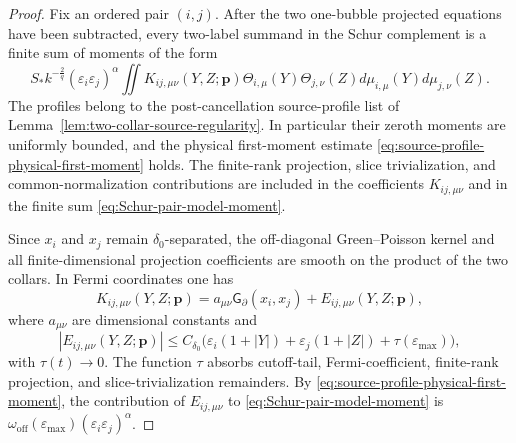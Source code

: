 \documentclass[11pt,reqno,a4paper]{amsart}
\numberwithin{equation}{section}
\theoremstyle{plain}
\theoremstyle{remark}
\theoremstyle{plain}
\begin{document}
\begin{proof}
Fix an ordered pair $(i,j)$.  After the two one-bubble projected equations have
been subtracted, every two-label summand in the Schur complement is a finite sum
of moments of the form
\begin{equation}\label{eq:Schur-pair-model-moment}
S_\ast k^{-\frac2q}
(\varepsilon_i\varepsilon_j)^\alpha
\iint
K_{ij,\mu\nu}(Y,Z;\mathbf p)
\Theta_{i,\mu}(Y)\Theta_{j,\nu}(Z)
d\mu_{i,\mu}(Y)d\mu_{j,\nu}(Z).
\end{equation}
The profiles belong to the post-cancellation source-profile list of
Lemma~\ref{lem:two-collar-source-regularity}.  In particular their zeroth moments
are uniformly bounded, and the physical first-moment estimate
\eqref{eq:source-profile-physical-first-moment} holds.
The finite-rank projection, slice
trivialization, and common-normalization contributions are included in the
coefficients $K_{ij,\mu\nu}$ and in the finite sum \eqref{eq:Schur-pair-model-moment}.

Since $x_i$ and $x_j$ remain $\delta_0$-separated, the off-diagonal Green--Poisson
kernel and all finite-dimensional projection coefficients are smooth on the
product of the two collars.  In Fermi coordinates one has
\begin{equation}\label{eq:Schur-kernel-freeze}
K_{ij,\mu\nu}(Y,Z;\mathbf p)
=
a_{\mu\nu}\mathsf G_\partial(x_i,x_j)
+
E_{ij,\mu\nu}(Y,Z;\mathbf p),
\end{equation}
where $a_{\mu\nu}$ are dimensional constants and
\begin{equation}\label{eq:Schur-kernel-freeze-error}
|E_{ij,\mu\nu}(Y,Z;\mathbf p)|
\le
C_{\delta_0}
\Big(
\varepsilon_i(1+|Y|)+\varepsilon_j(1+|Z|)
+\tau(\varepsilon_{\max})
\Big),
\end{equation}
with $\tau(t)\to0$.  The function $\tau$ absorbs cutoff-tail,
Fermi-coefficient, finite-rank projection, and slice-trivialization remainders.
By \eqref{eq:source-profile-physical-first-moment}, the contribution of
$E_{ij,\mu\nu}$ to \eqref{eq:Schur-pair-model-moment} is
$\omega_{\mathrm{off}}(\varepsilon_{\max})(\varepsilon_i\varepsilon_j)^\alpha$.


\end{proof}
\end{document}

